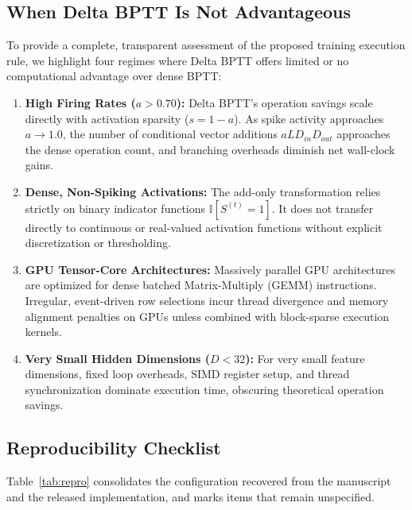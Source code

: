 \documentclass[10pt,journal,compsoc]{IEEEtran}
\begin{document}
\subsection{When Delta BPTT Is Not Advantageous}
To provide a complete, transparent assessment of the proposed training execution rule, we highlight four regimes where Delta BPTT offers limited or no computational advantage over dense BPTT:
\begin{enumerate}
    \item \textbf{High Firing Rates ($a > 0.70$):} Delta BPTT's operation savings scale directly with activation sparsity ($s = 1-a$). As spike activity approaches $a \to 1.0$, the number of conditional vector additions $a L D_{in} D_{out}$ approaches the dense operation count, and branching overheads diminish net wall-clock gains.
    \item \textbf{Dense, Non-Spiking Activations:} The add-only transformation relies strictly on binary indicator functions $\mathbb{I}[S^{(t)}=1]$. It does not transfer directly to continuous or real-valued activation functions without explicit discretization or thresholding.
    \item \textbf{GPU Tensor-Core Architectures:} Massively parallel GPU architectures are optimized for dense batched Matrix-Multiply (GEMM) instructions. Irregular, event-driven row selections incur thread divergence and memory alignment penalties on GPUs unless combined with block-sparse execution kernels.
    \item \textbf{Very Small Hidden Dimensions ($D < 32$):} For very small feature dimensions, fixed loop overheads, SIMD register setup, and thread synchronization dominate execution time, obscuring theoretical operation savings.
\end{enumerate}

\subsection{Reproducibility Checklist}
Table~\ref{tab:repro} consolidates the configuration recovered from the manuscript and the released implementation, and marks items that remain unspecified.
\end{document}
